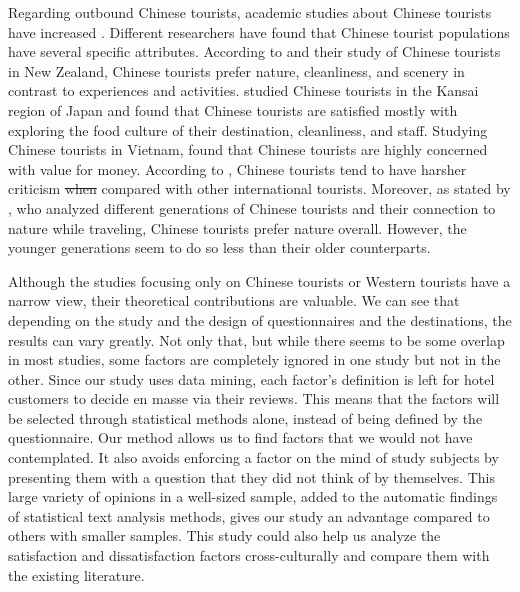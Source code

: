 \documentclass[smallextended,natbib]{svjour3}       %
\providecommand{\DIFdel}[1]{{\protect\color{red}\sout{#1}}}                      %
\providecommand{\DIFdelbegin}{} %
\providecommand{\DIFdelend}{} %
\newcommand{\DIFscaledelfig}{0.5}
\newlength{\DIFdelgraphicswidth} %
\newlength{\DIFdelgraphicsheight} %
\newcommand{\DIFdelincludegraphics}[2][]{%
\sbox{\DIFdelgraphicsbox}{\DIFOincludegraphics[#1]{#2}}%
\settoboxwidth{\DIFdelgraphicswidth}{\DIFdelgraphicsbox} %
\settoboxtotalheight{\DIFdelgraphicsheight}{\DIFdelgraphicsbox} %
\scalebox{\DIFscaledelfig}{%
\parbox[b]{\DIFdelgraphicswidth}{\usebox{\DIFdelgraphicsbox}\\[-\baselineskip] \rule{\DIFdelgraphicswidth}{0em}}\llap{\resizebox{\DIFdelgraphicswidth}{\DIFdelgraphicsheight}{%
\setlength{\unitlength}{\DIFdelgraphicswidth}%
\begin{picture}(1,1)%
\thicklines\linethickness{2pt} %
{\color[rgb]{1,0,0}\put(0,0){\framebox(1,1){}}}%
{\color[rgb]{1,0,0}\put(0,0){\line( 1,1){1}}}%
{\color[rgb]{1,0,0}\put(0,1){\line(1,-1){1}}}%
\end{picture}%
}\hspace*{3pt}}} %
} %
\DeclareRobustCommand{\DIFdelbegin}{\DIFOdelbegin \let\includegraphics\DIFdelincludegraphics} %
\DeclareRobustCommand{\DIFdelend}{\DIFOaddend \let\includegraphics\DIFOincludegraphics} %
\begin{document}
    Regarding outbound Chinese tourists, academic studies about Chinese tourists have increased \cite[][]{sun2017}. Different researchers have found that Chinese tourist populations have several specific attributes. According to \cite{ryan2001} and their study of Chinese tourists in New Zealand, Chinese tourists prefer nature, cleanliness, and scenery in contrast to experiences and activities. \cite{dongyang2015} studied Chinese tourists in the Kansai region of Japan and found that Chinese tourists are satisfied mostly with exploring the food culture of their destination, cleanliness, and staff. Studying Chinese tourists in Vietnam, \cite{truong2009} found that Chinese tourists are highly concerned with value for money. According to \cite{liu2019}, Chinese tourists tend to have harsher criticism \DIFdelbegin \DIFdel{when }\DIFdelend compared with other international tourists. Moreover, as stated by \cite{gao2017chinese}, who analyzed different generations of Chinese tourists and their connection to nature while traveling, Chinese tourists prefer nature overall. However, the younger generations seem to do so less than their older counterparts. 

    Although the studies focusing only on Chinese tourists or Western tourists have a narrow view, their theoretical contributions are valuable. We can see that depending on the study and the design of questionnaires and the destinations, the results can vary greatly. Not only that, but while there seems to be some overlap in most studies, some factors are completely ignored in one study but not in the other. Since our study uses data mining, each factor's definition is left for hotel customers to decide en masse via their reviews. This means that the factors will be selected through statistical methods alone, instead of being defined by the questionnaire. Our method allows us to find factors that we would not have contemplated. It also avoids enforcing a factor on the mind of study subjects by presenting them with a question that they did not think of by themselves. This large variety of opinions in a well-sized sample, added to the automatic findings of statistical text analysis methods, gives our study an advantage compared to others with smaller samples. This study could also help us analyze the satisfaction and dissatisfaction factors cross-culturally and compare them with the existing literature.
\end{document}
